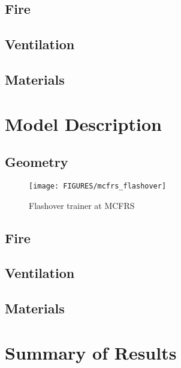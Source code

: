 \subsection{Fire}

\subsection{Ventilation}

\subsection{Materials}

\section{Model Description}

\subsection{Geometry}

\begin{figure}[\figoptions]
\begin{center}
\texttt{[image: FIGURES/mcfrs\_flashover]}
\end{center}
\caption {Flashover trainer at MCFRS}
\label{figflashoversmoke}%
\end{figure}

\subsection{Fire}

\subsection{Ventilation}

\subsection{Materials}

\section{Summary of Results}

